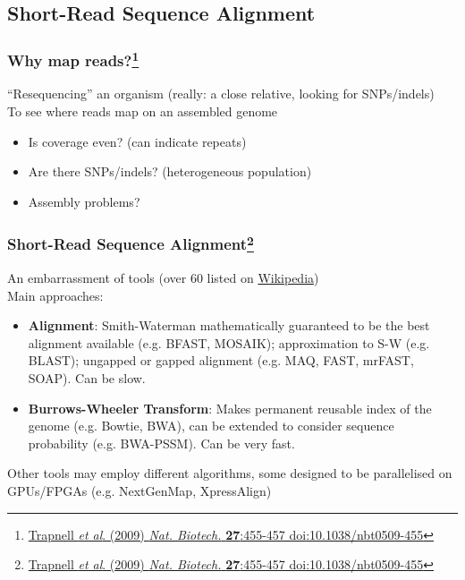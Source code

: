 
\subsection{Short-Read Sequence Alignment}

\begin{frame}
  \frametitle{Why map reads?\footnote{\tiny{\href{http://dx.doi.org/10.1038/nbt0509-455}{Trapnell \textit{et al}. (2009) \textit{Nat. Biotech.} \textbf{27}:455-457 doi:10.1038/nbt0509-455}}}}
  ``Resequencing'' an organism (really: a close relative, looking for SNPs/indels)\\
  To see where reads map on an assembled genome\\
  \begin{itemize}
    \item Is coverage even? (can indicate repeats)
    \item Are there SNPs/indels? (heterogeneous population)
    \item Assembly problems?
  \end{itemize}  
\end{frame}

\begin{frame}
  \frametitle{Short-Read Sequence Alignment\footnote{\tiny{\href{http://dx.doi.org/10.1038/nbt0509-455}{Trapnell \textit{et al}. (2009) \textit{Nat. Biotech.} \textbf{27}:455-457 doi:10.1038/nbt0509-455}}}}
  An embarrassment of tools (over 60 listed on \href{http://en.wikipedia.org/wiki/List_of_sequence_alignment_software}{Wikipedia})\\
  Main approaches:
  \begin{itemize}
    \item \textbf{Alignment}: Smith-Waterman mathematically guaranteed to be the best alignment available (e.g. BFAST, MOSAIK);  approximation to S-W (e.g. BLAST); ungapped or gapped alignment (e.g. MAQ, FAST, mrFAST, SOAP). Can be slow.
    \item \textbf{Burrows-Wheeler Transform}: Makes permanent reusable index of the genome (e.g. Bowtie, BWA), can be extended to consider sequence probability (e.g. BWA-PSSM). Can be very fast.
  \end{itemize}
  Other tools may employ different algorithms, some designed to be parallelised on GPUs/FPGAs (e.g. NextGenMap, XpressAlign)
\end{frame}

